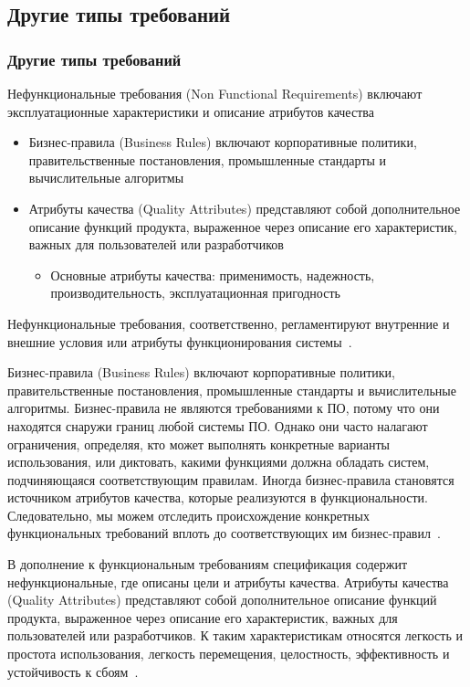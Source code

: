 \documentclass{../industrial-development}
\begin{document}
\subsection{Другие типы требований}
\begin{frame} \frametitle{Другие типы требований}
  \begin{block}{}
\alert{Нефункциональные требования (Non Functional Requirements)} включают эксплуатационные характеристики и описание атрибутов качества
  \end{block}
	\begin{itemize}
\item \alert{Бизнес-правила (Business Rules)} включают корпоративные политики, правительственные постановления, промышленные стандарты и вычислительные алгоритмы
\item \alert{Атрибуты качества (Quality Attributes)} представляют собой дополнительное описание функций продукта, выраженное через описание его характеристик, важных для пользователей или разработчиков
	\begin{itemize}
	\item Основные атрибуты качества: применимость,  надежность, производительность, эксплуатационная пригодность
	\end{itemize}
	\end{itemize}
		\end{frame}
		
\lecturenotes

Нефункциональные требования, соответственно, регламентируют внутренние и внешние условия или атрибуты функционирования системы~\cite[с.~10]{Maglinec}.

\alert{Бизнес-правила (Business Rules)} включают корпоративные политики, правительственные постановления, промышленные стандарты и вьчислительные алгоритмы. Бизнес-правила не являются требованиями к ПО, потому что они находятся снаружи границ любой системы ПО. Однако они часто налагают ограничения, определяя, кто может выполнять конкретные варианты использования, или диктовать, какими функциями должна обладать систем, подчиняющаяся соответствующим правилам. Иногда бизнес-правила становятся источником атрибутов качества, которые реализуются в функциональности. Следовательно, мы можем отследить происхождение конкретных функциональных требований вплоть до соответствующих им бизнес-правил~\cite[с.~9]{Wiegers}.

В дополнение к функциональным требованиям спецификация содержит нефункциональные, где описаны цели и атрибуты качества. \alert{Атрибуты качества (Quality Attributes)} представляют собой дополнительное описание функций продукта, выраженное через описание его характеристик, важных для пользователей или разработчиков. К таким характеристикам относятся легкость и простота использования, легкость перемещения, целостность, эффективность и устойчивость к сбоям~\cite[с.~10]{Wiegers}.
\end{document}
